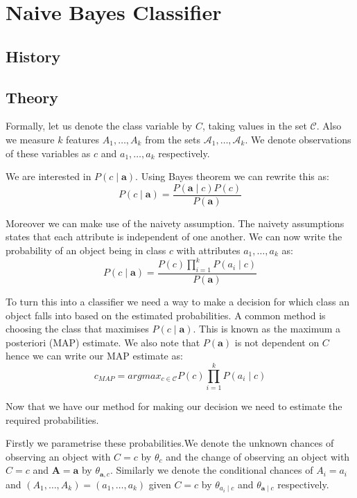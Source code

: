 \chapter{Naive Bayes Classifier}

\section{History}

\section{Theory}

Formally, let us denote the class variable by $C$, taking values in the set $\mathcal{C}$. Also we measure $k$ features $A_1,\dots,A_k$ from the sets $\mathcal{A}_1,\dots,\mathcal{A}_k$. We denote observations of these variables as $c$ and $a_1,\dots,a_k$ respectively.

We are interested in $P(c \mid \mathbf{a})$. Using Bayes theorem we can rewrite this as:
\begin{equation}
	P(c \mid \mathbf{a}) = \frac{P(\mathbf{a} \mid c)P(c)}{P(\mathbf{a})}
\end{equation}

Moreover we can make use of the naivety assumption. The naivety assumptions states that each attribute is independent of one another. We can now write the probability of an object being in class $c$ with attributes $a_1,\dots,a_k$ as:
\begin{equation}
	P(c \mid \mathbf{a}) = \frac{P(c)\prod_{i=1}^{k}P(a_i \mid c)}{P(\mathbf{a})}
\end{equation}

To turn this into a classifier we need a way to make a decision for which class an object falls into based on the estimated probabilities. A common method is choosing the class that maximises $P(c \mid \mathbf{a})$. This is known as the maximum a posteriori (MAP) estimate. We also note that $P(\mathbf{a})$ is not dependent on $C$ hence we can write our MAP estimate as:
\begin{equation}
	c_{MAP} = argmax_{c \in \mathcal{C}} P(c)\prod_{i=1}^{k}P(a_i \mid c)
\end{equation}

Now that we have our method for making our decision we need to estimate the required probabilities.

Firstly we parametrise these probabilities.We denote the unknown chances of observing an object with $C=c$ by $\theta_c$ and the change of observing an object with $C=c$ and $\mathbf{A} = \mathbf{a}$ by $\theta_{\mathbf{a}, c}$. Similarly we denote the conditional chances of $A_i=a_i$ and $(A_1,\dots,A_k)=(a_1,\dots,a_k)$ given $C=c$ by $\theta_{a_i \mid c}$ and $\theta_{\mathbf{a} \mid c}$ respectively.

